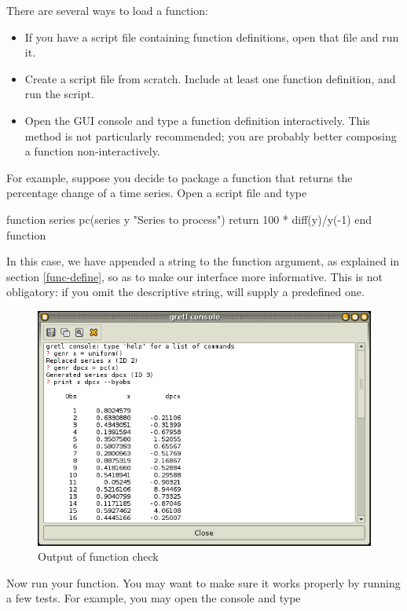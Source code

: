 There are several ways to load a function:

\begin{itemize}
\item If you have a script file containing function definitions, open
  that file and run it.
\item Create a script file from scratch.  Include at least one
  function definition, and run the script.
\item Open the GUI console and type a function definition
  interactively.  This method is not particularly recommended; you are
  probably better composing a function non-interactively.
\end{itemize}

For example, suppose you decide to package a function that returns the
percentage change of a time series. Open a script file and type
\begin{code}
function series pc(series y "Series to process")
  return 100 * diff(y)/y(-1)
end function
\end{code}
In this case, we have appended a string to the function argument, as
explained in section \ref{func-define}, so as to make our interface
more informative.  This is not obligatory: if you omit the descriptive
string,  will supply a predefined one.

\begin{figure}[htbp]
  \centering
  \includegraphics[scale=0.5]{figures/func_check}
  \caption{Output of function check}
  \label{fig:func_check}
\end{figure}

Now run your function. You may want to make sure it works properly by
running a few tests. For example, you may open the console and type


